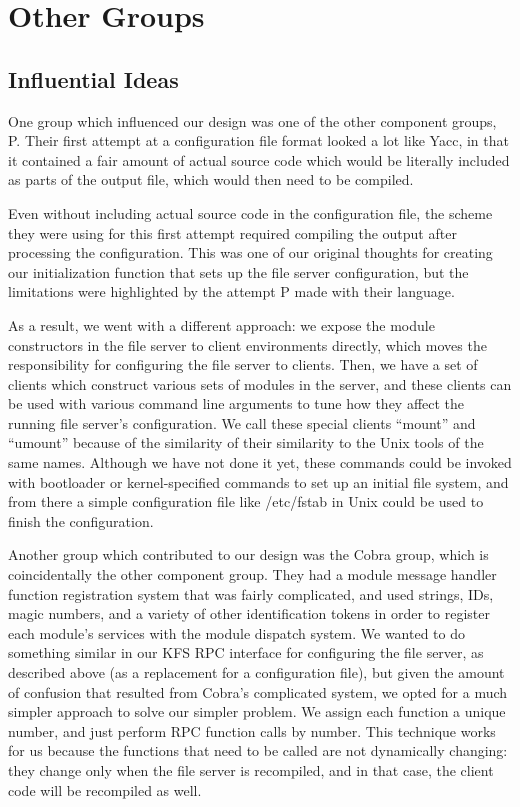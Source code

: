 \section{Other Groups}
\label{sec:groups}

\subsection{Influential Ideas}
\label{sec:groups:ideas}

One group which influenced our design was one of the other component groups, P.
Their first attempt at a configuration file format looked a lot like Yacc, in
that it contained a fair amount of actual source code which would be literally
included as parts of the output file, which would then need to be compiled.

Even without including actual source code in the configuration file, the scheme
they were using for this first attempt required compiling the output after
processing the configuration. This was one of our original thoughts for creating
our initialization function that sets up the file server configuration, but
the limitations were highlighted by the attempt P made with their language.

As a result, we went with a different approach: we expose the module
constructors in the file server to client environments directly, which moves the
responsibility for configuring the file server to clients. Then, we have a set
of clients which construct various sets of modules in the server, and these
clients can be used with various command line arguments to tune how they affect
the running file server's configuration. We call these special clients ``mount''
and ``umount'' because of the similarity of their similarity to the Unix tools
of the same names. Although we have not done it yet, these commands could be
invoked with bootloader or kernel-specified commands to set up an initial file
system, and from there a simple configuration file like /etc/fstab in Unix could
be used to finish the configuration.

Another group which contributed to our design was the Cobra group, which is
coincidentally the other component group. They had a module message handler
function registration system that was fairly complicated, and used strings,
IDs, magic numbers, and a variety of other identification tokens in order to
register each module's services with the module dispatch system. We wanted to do
something similar in our KFS RPC interface for configuring the file server, as
described above (as a replacement for a configuration file), but given the
amount of confusion that resulted from Cobra's complicated system, we opted for
a much simpler approach to solve our simpler problem. We assign each function a
unique number, and just perform RPC function calls by number. This technique
works for us because the functions that need to be called are not dynamically
changing: they change only when the file server is recompiled, and in that case,
the client code will be recompiled as well.

